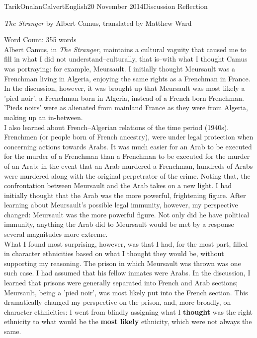 \documentclass[12pt,a4paper]{article}
\begin{document}
    \begin{mla}{Tarik}{Onalan}{Calvert}{English}{20 November 2014}{Discussion Reflection}
        \centerline{\textit{The Stranger} by Albert Camus, translated by Matthew Ward}
        \noindent{}Word Count: 355 words \\
        Albert Camus, in \textit{The Stranger}, maintains a cultural vaguity that
        caused me to fill in what I did not understand--culturally, that is--with
        what I thought Camus was portraying: for example, Meursault. I initially
        thought Meursault was a Frenchman living in Algeria, enjoying the same rights
        as a Frenchman in France. In the discussion, however, it was brought up
        that Meursault was most likely a 'pied noir', a Frenchman born in Algeria,
        instead of a French-born Frenchman. 'Pieds noirs' were as alienated from
        mainland France as they were from Algeria, making up an in-between. \\

        I also learned about French--Algerian relations of the time period (1940s).
        Frenchmen (or people born of French ancestry), were under legal protection when
        concerning actions towards Arabs. It was much easier for an Arab to be executed
        for the murder of a Frenchman than a Frenchman to be executed for the murder of an
        Arab; in the event that an Arab murdered a Frenchman, hundreds of Arabs were
        murdered along with the original perpetrator of the crime. Noting that, the
        confrontation between Meursault and the Arab takes on a new light. I had initially
        thought that the Arab was the more powerful, frightening figure. After learning
        about Meursault's possible legal immunity, however, my perspective changed:
        Meursault was the more powerful figure. Not only did he have political immunity,
        anything the Arab did to Meursault would be met by a response several magnitudes
        more extreme. \\

        What I found most surprising, however, was that I had, for the most part,
        filled in character ethnicities based on what I thought they would be, without
        supporting my reasoning. The prison in which Meursault was thrown was one such
        case. I had assumed that his fellow inmates were Arabs. In the discussion,
        I learned that prisons were generally separated into French and Arab sections;
        Meursault, being a 'pied noir', was most likely put into the French section.
        This dramatically changed my perspective on the prison, and, more broadly, on
        character ethnicities: I went from blindly assigning what I \textbf{thought}
        was the right ethnicity to what would be the \textbf{most likely} ethnicity,
        which were not always the same.
    \end{mla}
\end{document}
